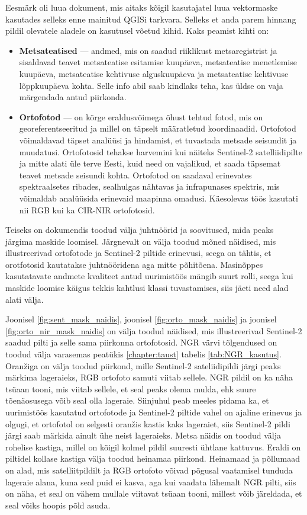 Eesmärk oli luua dokument, mis aitaks kõigil kasutajatel luua vektormaske kasutades selleks enne mainitud QGISi tarkvara. Selleks et anda parem hinnang pildil olevatele aladele on kasutusel võetud kihid. Kaks peamist kihti on:
\begin{itemize}[topsep=1pt,itemsep=1ex,partopsep=1ex,parsep=1ex]
    \item \textbf{Metsateatised} --- andmed, mis on saadud riiklikust metsaregistrist ja sisaldavad teavet metsateatise esitamise kuupäeva, metsateatise menetlemise kuupäeva, metsateatise kehtivuse alguskuupäeva ja metsateatise kehtivuse lõppkuupäeva kohta. Selle info abil saab kindlaks teha, kas üldse on vaja märgendada antud piirkonda.
    \item \textbf{Ortofotod} --- on kõrge eraldusvõimega õhust tehtud fotod, mis on georeferentseeritud ja millel on täpselt määratletud koordinaadid. Ortofotod võimaldavad täpset analüüsi ja hindamist, et tuvastada metsade seisundit ja muudatusi. Ortofotosid tehakse harvemini kui näiteks Sentinel-2 satelliidipilte ja mitte alati üle terve Eesti, kuid need on vajalikud, et saada täpsemat teavet metsade seisundi kohta. Ortofotod on saadaval erinevates spektraalsetes ribades, sealhulgas nähtavas ja infrapunases spektris, mis võimaldab analüüsida erinevaid maapinna omadusi. Käesolevas töös kasutati nii RGB kui ka CIR-NIR ortofotosid. 
\end{itemize}

Teiseks on dokumendis toodud välja juhtnöörid ja soovitused, mida peaks järgima
maskide loomisel. Järgnevalt on välja toodud mõned näidised, mis illustreerivad ortofotode ja Sentinel-2 piltide erinevusi, seega on tähtis, et orotfotosid kautatakse juhtnööridena aga mitte põhitõena. Masinõppes kasutatavate andmete kvaliteet antud uurimistöös mängib suurt rolli, seega kui maskide loomise käigus tekkis kahtlusi klassi tuvastamises, siis jäeti need alad alati välja.

Joonisel \ref{fig:sent_mask_naidis}, joonisel \ref{fig:orto_mask_naidis} ja joonisel \ref{fig:orto_nir_mask_naidis} on välja toodud näidised, mis illustreerivad Sentinel-2 saadud pilti ja selle sama piirkonna ortofotosid. NGR värvi tõlgendused on toodud välja varasemas peatükis \ref{chapter:taust} tabelis \ref{tab:NGR_kasutus}. Oranžiga on välja toodud piirkond, mille Sentinel-2 sateliidipildi järgi peaks märkima lageraieks, RGB ortofoto samuti viitab sellele. NGR pildil on ka näha tsüaan tooni, mis viitab sellele, et seal peaks olema mulda, ehk suure tõenäosusega võib seal olla lageraie. Siinjuhul peab meeles pidama ka, et uurimistöös kasutatud ortofotode ja Sentinel-2 piltide vahel on ajaline erinevus ja olgugi, et ortofotol on selgesti oranžis kastis kaks lageraiet, siis Sentinel-2 pildi järgi saab märkida ainult ühe neist lageraieks. Metsa näidis on toodud välja rohelise kastiga, millel on kõigil kolmel pildil suuresti ühtlane kattuvus. Eraldi on piltidel kollase kastiga välja toodud heinamaa piirkond. Heinamaad ja põllumaad on alad, mis satelliitpildilt ja RGB ortofoto võivad põgusal vaatamisel tunduda lageraie alana, kuna seal puid ei kasva, aga kui vaadata lähemalt NGR pilti, siis on näha, et seal on vähem mullale viitavat tsüaan tooni, millest võib järeldada, et seal võiks hoopis põld asuda.

